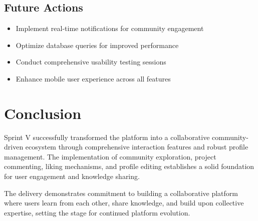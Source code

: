\subsection{Future Actions}
\begin{itemize}
\item Implement real-time notifications for community engagement
\item Optimize database queries for improved performance
\item Conduct comprehensive usability testing sessions
\item Enhance mobile user experience across all features
\end{itemize}

\section{Conclusion}

Sprint V successfully transformed the platform into a collaborative community-driven ecosystem through comprehensive interaction features and robust profile management. The implementation of community exploration, project commenting, liking mechanisms, and profile editing establishes a solid foundation for user engagement and knowledge sharing.

The delivery demonstrates commitment to building a collaborative platform where users learn from each other, share knowledge, and build upon collective expertise, setting the stage for continued platform evolution.